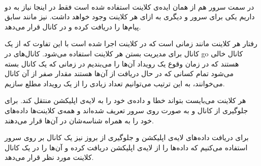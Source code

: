 \documentclass[paper=a4, fontsize=11pt]{article}
\numberwithin{equation}{section} %
\numberwithin{figure}{section} %
\numberwithin{table}{section} %
\begin{document}
\paragraph{}
در سمت سرور هم از همان ایده‌ی کلاینت استفاده شده است فقط در اینجا
نیاز به دو 
داریم یکی برای سرور و دیگری به ازای هر کلاینت وجود خواهد داشت.
 نیز مانند سابق پیام‌ها را دریافت کرده
و در کانال  قرار می‌دهد.

رفتار  هر کلاینت مانند زمانی است که در کلاینت اجرا شده است
با این تفاوت که از یک کانال  برای مدیریت بستن هر کلاینت استفاده می‌شود.
کانال‌های  در go کانال خالی هستند که در زمان وقوع یک رویداد آن‌ها را می‌بندیم
در زمانی که یک کانال بسته می‌شود تمام کسانی که در حال دریافت از آن‌ها هستند مقدار صفر از آن کانال می‌خوانند،
به این ترتیب می‌توانیم تعداد زیادی  را از یک رویداد مطلع سازیم.

هر کلاینت می‌بایست بتواند خطا و داده‌ی خود را به لایه‌ی اپلیکشن منتقل کند. برای جلوگیری از
کانال  و 
به صورت 
روی سرور تعریف شده‌اند و همه‌ی کلاینت‌ها داده‌های خود را به همراه شناسه‌شان در آن‌ها قرار می‌دهند.

برای دریافت داده‌های لایه‌ی اپلیکشن و جلوگیری از بروز
نیز یک کانال  بر روی سرور استفاده می‌کنیم
که داده‌ها را از لایه‌ی اپلیکشن دریافت کرده و آن‌ها را در یک کانال
کلاینت مورد نظر قرار می‌دهد.
\end{document}
